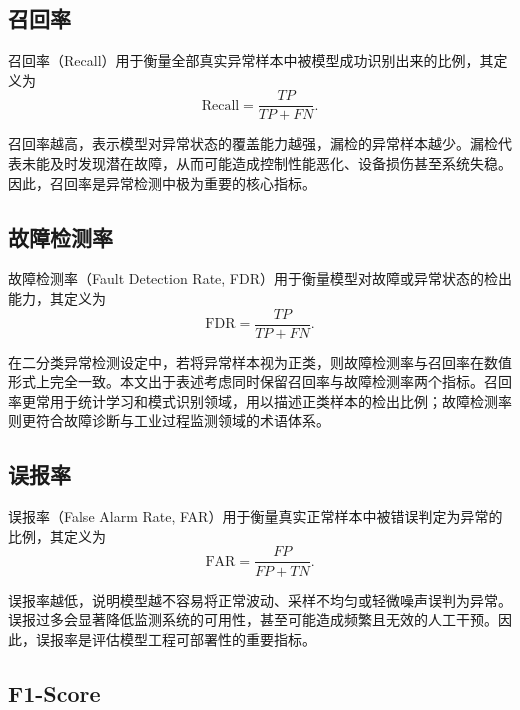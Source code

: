 \documentclass[bachelor, vlined]{DissertUESTC}
\begin{document}
    \subsection{召回率}

    召回率（Recall）用于衡量全部真实异常样本中被模型成功识别出来的比例，其定义为
    \begin{equation}
        \mathrm{Recall}
        =
        \frac{TP}{TP + FN}.
    \end{equation}

    召回率越高，表示模型对异常状态的覆盖能力越强，漏检的异常样本越少。漏检代表未能及时发现潜在故障，从而可能造成控制性能恶化、设备损伤甚至系统失稳。因此，召回率是异常检测中极为重要的核心指标。

    \subsection{故障检测率}

    故障检测率（Fault Detection Rate, FDR）用于衡量模型对故障或异常状态的检出能力，其定义为
    \begin{equation}
        \mathrm{FDR}
        =
        \frac{TP}{TP + FN}.
    \end{equation}

    在二分类异常检测设定中，若将异常样本视为正类，则故障检测率与召回率在数值形式上完全一致。本文出于表述考虑同时保留召回率与故障检测率两个指标。召回率更常用于统计学习和模式识别领域，用以描述正类样本的检出比例；故障检测率则更符合故障诊断与工业过程监测领域的术语体系。

    \subsection{误报率}

    误报率（False Alarm Rate, FAR）用于衡量真实正常样本中被错误判定为异常的比例，其定义为
    \begin{equation}
        \mathrm{FAR}
        =
        \frac{FP}{FP + TN}.
    \end{equation}

    误报率越低，说明模型越不容易将正常波动、采样不均匀或轻微噪声误判为异常。误报过多会显著降低监测系统的可用性，甚至可能造成频繁且无效的人工干预。因此，误报率是评估模型工程可部署性的重要指标。

    \subsection{F1-Score}
\end{document}
